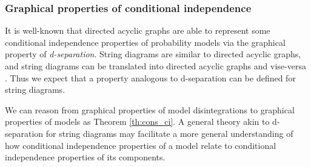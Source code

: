 \subsubsection{Graphical properties of conditional independence}

It is well-known that directed acyclic graphs are able to represent some conditional independence properties of probability models via the graphical property of \emph{d-separation}. String diagrams are similar to directed acyclic graphs, and string diagrams can be translated into directed acyclic graphs and vise-versa \citep{fong_causal_2013}. Thus we expect that a property analogous to d-separation can be defined for string diagrams.

We can reason from graphical properties of model disintegrations to graphical properties of models as Theorem \ref{th:cons_ci}. A general theory akin to d-separation for string diagrams may facilitate a more general understanding of how conditional independence properties of a model relate to conditional independence properties of its components.






